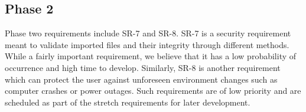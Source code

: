\documentclass{article}
\begin{document}
\subsection{Phase 2}
Phase two requirements include SR-7 and SR-8. SR-7 is a security requirement meant to validate imported files and their 
integrity through different methods. While a fairly important requirement, we believe that it has a low probability of 
occurrence and high time to develop. Similarly, SR-8 is another requirement which can protect the user against 
unforeseen environment changes such as computer crashes or power outages. Such requirements are of low priority and are 
scheduled as part of the stretch requirements for later development.
\end{document}
